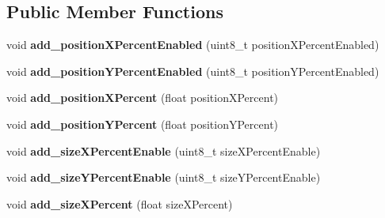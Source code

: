 \subsection*{Public Member Functions}
\begin{DoxyCompactItemize}
\item 
\mbox{\label{structflatbuffers_1_1LayoutComponentTableBuilder_a99d8c49e3a8a2af79b82c69b6562fe71}} 
void {\bfseries add\+\_\+position\+X\+Percent\+Enabled} (uint8\+\_\+t position\+X\+Percent\+Enabled)
\item 
\mbox{\label{structflatbuffers_1_1LayoutComponentTableBuilder_a09af14a6900a5fda6da1fca969ec77d4}} 
void {\bfseries add\+\_\+position\+Y\+Percent\+Enabled} (uint8\+\_\+t position\+Y\+Percent\+Enabled)
\item 
\mbox{\label{structflatbuffers_1_1LayoutComponentTableBuilder_a2847647add1b063916672a358ef6d765}} 
void {\bfseries add\+\_\+position\+X\+Percent} (float position\+X\+Percent)
\item 
\mbox{\label{structflatbuffers_1_1LayoutComponentTableBuilder_abd7d19f99b737a96a57aceae49f12fbe}} 
void {\bfseries add\+\_\+position\+Y\+Percent} (float position\+Y\+Percent)
\item 
\mbox{\label{structflatbuffers_1_1LayoutComponentTableBuilder_a2535c8654f981da6f901f0518fb7bc49}} 
void {\bfseries add\+\_\+size\+X\+Percent\+Enable} (uint8\+\_\+t size\+X\+Percent\+Enable)
\item 
\mbox{\label{structflatbuffers_1_1LayoutComponentTableBuilder_a4f4e479d2d6c853877d38748edf1cf94}} 
void {\bfseries add\+\_\+size\+Y\+Percent\+Enable} (uint8\+\_\+t size\+Y\+Percent\+Enable)
\item 
\mbox{\label{structflatbuffers_1_1LayoutComponentTableBuilder_a3b6dabe6271d6409d0ef0daeacfba820}} 
void {\bfseries add\+\_\+size\+X\+Percent} (float size\+X\+Percent)
\item 

\end{DoxyCompactItemize}
